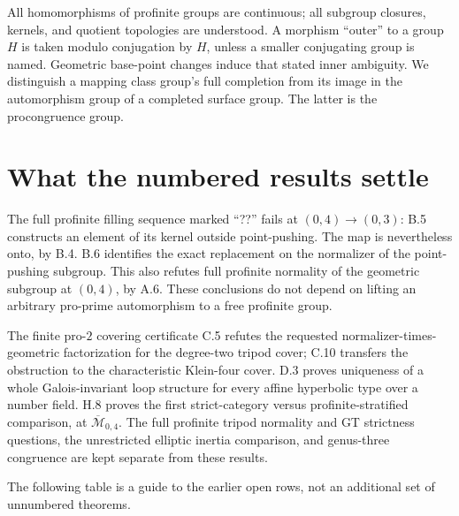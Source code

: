 \documentclass[10pt,a4paper]{article}
\begin{document}
All homomorphisms of profinite groups are continuous; all subgroup closures, kernels, and quotient topologies are understood. A morphism ``outer'' to a group \(H\) is taken modulo conjugation by \(H\), unless a smaller conjugating group is named. Geometric base-point changes induce that stated inner ambiguity. We distinguish a mapping class group's full completion from its image in the automorphism group of a completed surface group. The latter is the procongruence group.

\section{What the numbered results settle}\label{what-the-numbered-results-settle}

The full profinite filling sequence marked ``??'' fails at \((0,4)\to(0,3)\): B.5 constructs an element of its kernel outside point-pushing. The map is nevertheless onto, by B.4. B.6 identifies the exact replacement on the normalizer of the point-pushing subgroup. This also refutes full profinite normality of the geometric subgroup at \((0,4)\), by A.6. These conclusions do not depend on lifting an arbitrary pro-prime automorphism to a free profinite group.

The finite pro-\(2\) covering certificate C.5 refutes the requested normalizer-times-geometric factorization for the degree-two tripod cover; C.10 transfers the obstruction to the characteristic Klein-four cover. D.3 proves uniqueness of a whole Galois-invariant loop structure for every affine hyperbolic type over a number field. H.8 proves the first strict-category versus profinite-stratified comparison, at \(\overline{\mathcal M}_{0,4}\). The full profinite tripod normality and GT strictness questions, the unrestricted elliptic inertia comparison, and genus-three congruence are kept separate from these results.

The following table is a guide to the earlier open rows, not an additional set of unnumbered theorems.
\end{document}
